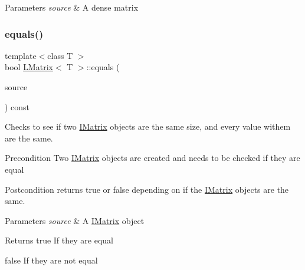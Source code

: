 \begin{DoxyParams}{Parameters}
{\em source} & A dense matrix \\
\hline
\end{DoxyParams}
\mbox{\label{class_l_matrix_a7879243ad84666fe92c449abfce41da5}} 
\subsubsection{\texorpdfstring{equals()}{equals()}\hspace{0.1cm}{\footnotesize\ttfamily [1/6]}}
{\footnotesize\ttfamily template$<$class T $>$ \\
bool \mbox{\hyperlink{class_l_matrix}{L\+Matrix}}$<$ T $>$\+::equals (\begin{DoxyParamCaption}\item[{const \mbox{\hyperlink{class_i_matrix}{I\+Matrix}}$<$ \mbox{\hyperlink{class_matrix}{Matrix}}$<$ T $>$, T $>$ \&}]{source }\end{DoxyParamCaption}) const}



Checks to see if two \mbox{\hyperlink{class_i_matrix}{I\+Matrix}} objects are the same size, and every value withem are the same. 

\begin{DoxyPrecond}{Precondition}
Two \mbox{\hyperlink{class_i_matrix}{I\+Matrix}} objects are created and needs to be checked if they are equal 
\end{DoxyPrecond}
\begin{DoxyPostcond}{Postcondition}
returns true or false depending on if the \mbox{\hyperlink{class_i_matrix}{I\+Matrix}} objects are the same.
\end{DoxyPostcond}

\begin{DoxyParams}{Parameters}
{\em source} & A \mbox{\hyperlink{class_i_matrix}{I\+Matrix}} object \\
\hline
\end{DoxyParams}
\begin{DoxyReturn}{Returns}
true If they are equal 

false If they are not equal 
\end{DoxyReturn}
\mbox{\label{class_l_matrix_a4cd960c8bd0a7683a970f93fe4b29de5}} 
